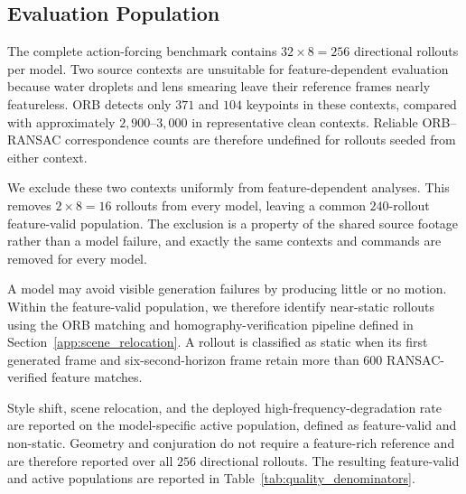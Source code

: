 \subsection{Evaluation Population}
\label{app:quality_population}

The complete action-forcing benchmark contains $32\times8=256$ directional
rollouts per model. Two source contexts are unsuitable for feature-dependent
evaluation because water droplets and lens smearing leave their reference
frames nearly featureless. ORB detects only $371$ and $104$ keypoints in these
contexts, compared with approximately $2{,}900$--$3{,}000$ in representative
clean contexts. Reliable ORB--RANSAC correspondence counts are therefore
undefined for rollouts seeded from either context.

We exclude these two contexts uniformly from feature-dependent analyses. This
removes $2\times8=16$ rollouts from every model, leaving a common
$240$-rollout feature-valid population. The exclusion is a property of the
shared source footage rather than a model failure, and exactly the same
contexts and commands are removed for every model.

A model may avoid visible generation failures by producing little or no
motion. Within the feature-valid population, we therefore identify
near-static rollouts using the ORB matching and homography-verification
pipeline defined in Section~\ref{app:scene_relocation}. A rollout is classified
as static when its first generated frame and six-second-horizon frame retain
more than $600$ RANSAC-verified feature matches.

Style shift, scene relocation, and the deployed high-frequency-degradation
rate are reported on the model-specific active population, defined as
feature-valid and non-static. Geometry and conjuration do not require a
feature-rich reference and are therefore reported over all $256$ directional
rollouts. The resulting feature-valid and active populations are reported in
Table~\ref{tab:quality_denominators}.

